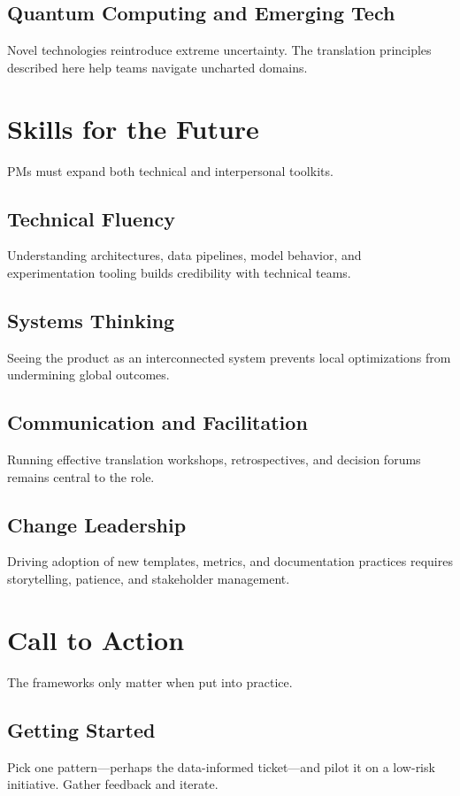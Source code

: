 \subsection{Quantum Computing and Emerging Tech}
Novel technologies reintroduce extreme uncertainty. The translation principles described here help teams navigate uncharted domains.

\section{Skills for the Future}
\label{sec:future-skills}

PMs must expand both technical and interpersonal toolkits.

\subsection{Technical Fluency}
Understanding architectures, data pipelines, model behavior, and experimentation tooling builds credibility with technical teams.

\subsection{Systems Thinking}
Seeing the product as an interconnected system prevents local optimizations from undermining global outcomes.

\subsection{Communication and Facilitation}
Running effective translation workshops, retrospectives, and decision forums remains central to the role.

\subsection{Change Leadership}
Driving adoption of new templates, metrics, and documentation practices requires storytelling, patience, and stakeholder management.

\section{Call to Action}
\label{sec:call-to-action}

The frameworks only matter when put into practice.

\subsection{Getting Started}
Pick one pattern—perhaps the data-informed ticket—and pilot it on a low-risk initiative. Gather feedback and iterate.

